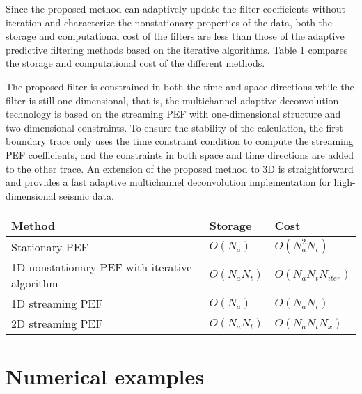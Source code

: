 Since the proposed method can adaptively update the filter coefficients
without iteration and characterize the nonstationary properties of the data,
both the storage and computational cost of the filters are less than those of
the adaptive predictive filtering methods based on the iterative algorithms.
Table 1 compares the storage and computational cost of the different methods.

The proposed filter is constrained in both the time and space directions
while the filter is still one-dimensional, that is, the multichannel adaptive
deconvolution technology is based on the streaming PEF with one-dimensional
structure and two-dimensional constraints. To ensure the stability of the
calculation, the first boundary trace only uses the time constraint
condition to compute the streaming PEF coefficients, and the constraints in
both space and time directions are added to the other trace. An extension
of the proposed method to 3D is straightforward and provides a fast adaptive
multichannel deconvolution implementation for high-dimensional seismic data. 

{
\begin{center}
 \begin{tabular}{|l|l|l|}
  \hline
   Method & Storage & Cost \\
  \hline
   Stationary PEF & $O(N_a)$ & $O(N_a^2N_t)$ \\
  \hline
   1D nonstationary PEF with iterative algorithm & $O(N_aN_t)$ &
   $O(N_aN_tN_{iter})$ \\
  \hline
   1D streaming PEF & $O(N_a)$ & $O(N_aN_t)$ \\
  \hline
   2D streaming PEF & $O(N_aN_t)$ & $O(N_aN_tN_x)$ \\
  \hline
 \end{tabular}
\end{center}
}

\section{Numerical examples}

